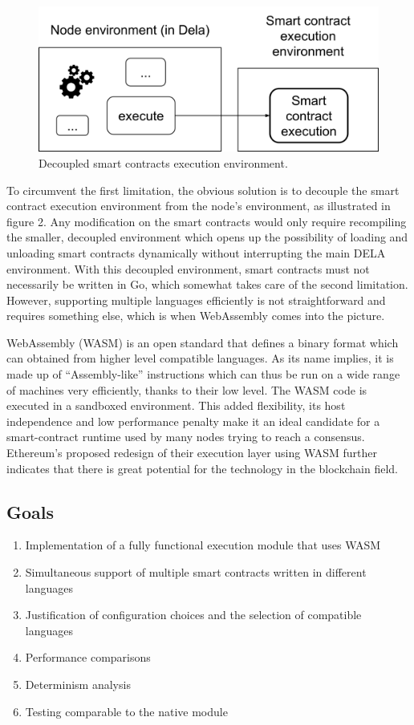 \documentclass[11pt, a4paper, twoside, openright]{article}
\begin{document}
\begin{figure}[htbp]
 \centering
  \includegraphics[width=12cm]{wasm2.png}
  \caption{Decoupled smart contracts execution environment.}
\end{figure}

To circumvent the first limitation, the obvious solution is to decouple the smart contract execution environment from the node's environment, as illustrated in figure 2. Any modification on the smart contracts would only require recompiling the smaller, decoupled environment which opens up the possibility of loading and unloading smart contracts dynamically without interrupting the main DELA environment. With this decoupled environment, smart contracts must not necessarily be written in Go, which somewhat takes care of the second limitation. However, supporting multiple languages efficiently is not straightforward and requires something else, which is when WebAssembly comes into the picture.

WebAssembly (WASM) is an open standard that defines a binary format which can obtained from higher level compatible languages. As its name implies, it is made up of ``Assembly-like'' instructions which can thus be run on a wide range of machines very efficiently, thanks to their low level. The WASM code is executed in a sandboxed environment. This added flexibility, its host independence and low performance penalty make it an ideal candidate for a smart-contract runtime used by many nodes trying to reach a consensus. Ethereum's proposed redesign of their execution layer using WASM further indicates that there is great potential for the technology in the blockchain field. 

\subsection{Goals}
\label{Goals}

\begin{enumerate} 

\itemsep0em

 \item Implementation of a fully functional execution module that uses WASM
 \item Simultaneous support of multiple smart contracts written in different languages
 \item Justification of configuration choices and the selection of compatible languages
 \item Performance comparisons
 \item Determinism analysis
 \item Testing comparable to the native module

\end{enumerate} 
\end{document}
